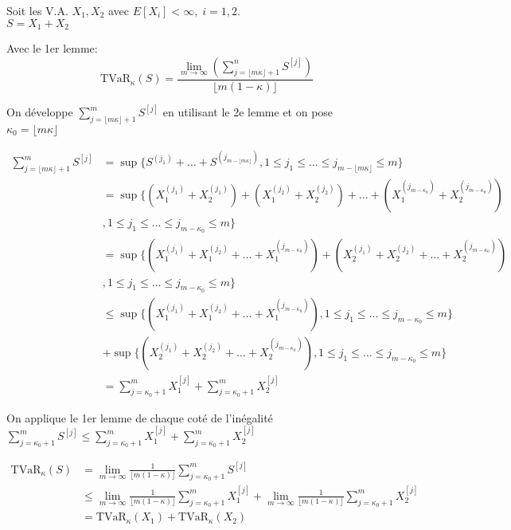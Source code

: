 Soit les V.A. \(X_1,X_2\) avec \(E[X_i]<\infty,\;i=1,2\).\\
\(S=X_1+X_2\)

Avec le 1er lemme:\\
\[\text{TVaR}_{\kappa}(S) =\frac{\lim_{m\to\infty} \left(\sum^n_{j=\lfloor m\kappa\rfloor +1} S^{[j]} \right)}{\lfloor m(1-\kappa)\rfloor}\]

On développe \(\sum^m_{j=\lfloor m\kappa\rfloor +1} S^{[j]}\) en
utilisant le 2e lemme et on pose \\
\(\kappa_0=\lfloor m\kappa \rfloor\)

\begin{align*}
\sum^m_{ j =  \lfloor m \kappa \rfloor +1 } S^{ [j] } & = \sup \{ S^{ (j_1) } + \dots + S^{ ( j_{ m-\lfloor m \kappa \rfloor } ) } ,1 \le j_1 \le \dots \le j_{ m- \lfloor m \kappa \rfloor } \le m \} \\
& = \sup \{ \left( X^{ (j_1) }_1 + X^{ (j_1) }_2 \right) +\left( X^{ (j_2) }_1 + X^{ (j_2) }_2 \right) + \dots + \left( X^{ ( j_{ m - \kappa_0 } ) }_1 + X^{ ( j_{ m-\kappa_0} ) }_2 \right) \\ 
& ,1 \le j_1 \le \dots \le j_{ m-\kappa_0 }\le m \} \\
& = \sup \{ \left( X_1^{ (j_1) } + X_1^{ (j_2) } + \dots + X_1^{ ( j_{ m-\kappa_0 } ) } \right) +\left( X_2^{ (j_1) } + X_2^{ (j_2) } + \dots + X_2^{ ( j_{ m-\kappa_0 } ) } \right) \\
& ,1 \le j_1 \le \dots \le j_{ m-\kappa_0 } \le m \}\\ 
& \le \sup \{ \left( X_1^{ (j_1) } + X_1^{ (j_2) } + \dots + X_1^{ ( j_{ m-\kappa_0 } ) } \right) ,1 \le j_1 \le  \dots \le j_{ m-\kappa_0 } \le m \}\\
& + \sup \{ \left( X_2^{ (j_1) } + X_2^{ (j_2) } + \dots +X_2^{ ( j_{ m-\kappa_0 } ) } \right) ,1 \le j_1 \le \dots \le j_{ m -\kappa_0 } \le m \} \\
& = \sum^m_{ j=\kappa_0 +1 } X_1^{ [j] } + \sum^m_{ j=\kappa_0 +1 } X_2^{ [j] }
\end{align*}

On applique le 1er lemme de chaque coté de l'inégalité\\
\(\sum^m_{j=\kappa_0 +1} S^{[j]}\le\sum^m_{j=\kappa_0 +1} X_1^{[j]}+\sum^m_{j=\kappa_0 +1} X_2^{[j]}\)

\begin{align*}
\text{TVaR}_\kappa(S)& = \lim_{m\to\infty}\frac{1}{\lfloor m(1-\kappa)\rfloor} \sum^m_{j=\kappa_0 +1} S^{[j]}\\
& \le \lim_{m\to\infty}\frac{1}{\lfloor m(1-\kappa)\rfloor} \sum^m_{j=\kappa_0 +1} X_1^{[j]} + \lim_{m\to\infty}\frac{1}{\lfloor m(1-\kappa)\rfloor} \sum^m_{j=\kappa_0 +1} X_2^{[j]}\\
& =\text{TVaR}_\kappa(X_1)+\text{TVaR}_\kappa(X_2)
\end{align*}



